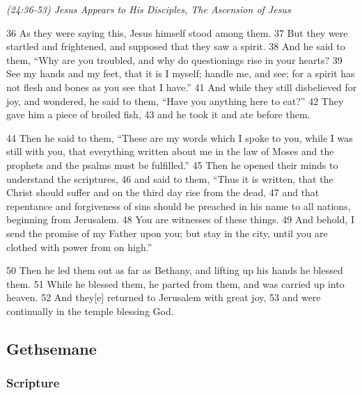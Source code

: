 \documentclass[letterpaper]{report}
\begin{document}
{\centering
	\emph{(24:36-53) Jesus Appears to His Disciples, The Ascension of Jesus}\\
}
\begin{multicols}{2}
36 As they were saying this, Jesus himself stood among them. 37 But they were startled and frightened, and supposed that they saw a spirit. 38 And he said to them, “Why are you troubled, and why do questionings rise in your hearts? 39 See my hands and my feet, that it is I myself; handle me, and see; for a spirit has not flesh and bones as you see that I have.” 41 And while they still disbelieved for joy, and wondered, he said to them, “Have you anything here to eat?” 42 They gave him a piece of broiled fish, 43 and he took it and ate before them.

44 Then he said to them, “These are my words which I spoke to you, while I was still with you, that everything written about me in the law of Moses and the prophets and the psalms must be fulfilled.” 45 Then he opened their minds to understand the scriptures, 46 and said to them, “Thus it is written, that the Christ should suffer and on the third day rise from the dead, 47 and that repentance and forgiveness of sins should be preached in his name to all nations, beginning from Jerusalem. 48 You are witnesses of these things. 49 And behold, I send the promise of my Father upon you; but stay in the city, until you are clothed with power from on high.”

50 Then he led them out as far as Bethany, and lifting up his hands he blessed them. 51 While he blessed them, he parted from them, and was carried up into heaven. 52 And they[e] returned to Jerusalem with great joy, 53 and were continually in the temple blessing God.

\end{multicols}

\clearpage
\subsection{Gethsemane}
\begin{multicols}{2}
	\mbox{}
\end{multicols}
\subsubsection{Scripture}
\end{document}
